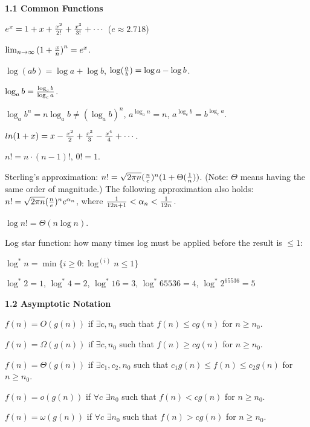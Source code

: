 

    \textbf{1.1 Common Functions}

$e^x=1+x+{x^2\over 2!}+{x^3\over 3!}+\cdots$ ($e \approx 2.718$)

$\lim_{n\to\infty}{(1+{x\over n})}^n=e^x$.

$\log(ab)=\log a+\log b$, $\log ({a\over b})=\log a-\log b$.

$\log_a b={{\log_c b}\over {\log_c a}}$.

$\log_a b^n=n\log_a b\not={(\log_a b)}^n$, $a^{\log_a n}=n$,
$a^{\log_c b}=b^{\log_c a}$.

$ln(1+x)=x-{x^2\over 2}+{x^3\over 3}-{x^4\over 4}+\cdots$.

$n!=n\cdot (n-1)!$, $0!=1$.

Sterling's approximation: $n!=\sqrt{2\pi n}({n\over e})^n(1+
\Theta({1\over n}))$. (Note: $\Theta$ means having the same order of 
magnitude.) The following approximation also holds:
$n!=\sqrt{2\pi n}({n\over e})^ne^{\alpha_n}$, where
${1\over 12n+1}<\alpha_n<{1\over 12n}$.

$\log n!=\Theta(n\log n)$.

Log star function: how many times log must be applied before the result is $\le 1$:

$\log^* n=\min\{i\ge0:\log^{(i)}n\le1\}$

$\log^*2=1$, $\log^* 4=2$, $\log^*16=3$, $\log^*65536=4$, $\log^*2^{65536}=5$

    \textbf{1.2 Asymptotic Notation}


\item $f(n)=O(g(n))$ if $\exists c, n_0$ such that 
$f(n)\le cg(n)$ for $n\ge n_0$.

\item $f(n)=\Omega(g(n))$ if $\exists c, n_0$ such that
$f(n)\ge cg(n)$ for $n\ge n_0$.

\item $f(n)=\Theta(g(n))$ if $\exists c_1, c_2, n_0$ such that
$c_1g(n)\le f(n)\le c_2g(n)$ for $n\ge n_0$.

\item $f(n)=o(g(n))$ if $\forall c$ $\exists n_0$ such that
$f(n)<cg(n)$ for $n\ge n_0$. 

\item $f(n)=\omega(g(n))$ if $\forall c$ $\exists n_0$ such that 
$f(n)>cg(n)$ for $n\ge n_0$.


